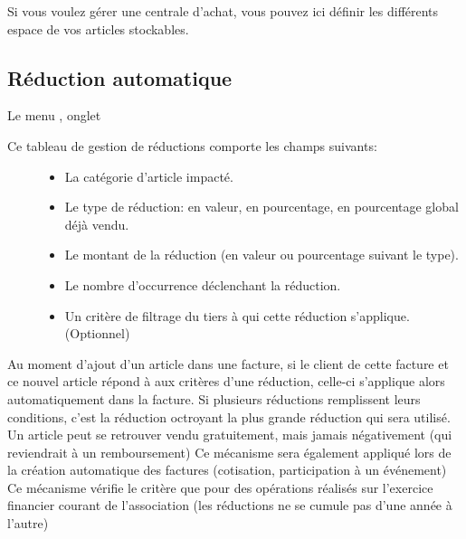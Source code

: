 \documentclass[a4paper,10pt,oneside,french]{sphinxmanual}
\begin{document}
Si vous voulez gérer une centrale d’achat, vous pouvez ici définir les différents espace de vos articles stockables.


\subsection{Réduction automatique}
\label{\detokenize{invoice/configuration:reduction-automatique}}
Le menu , onglet 
\begin{description}
\item[{Ce tableau de gestion de réductions comporte les champs suivants:}] \leavevmode\begin{itemize}
\item {} 
La catégorie d’article impacté.

\item {} 
Le type de réduction: en valeur, en pourcentage, en pourcentage global déjà vendu.

\item {} 
Le montant de la réduction (en valeur ou pourcentage suivant le type).

\item {} 
Le nombre d’occurrence déclenchant la réduction.

\item {} 
Un critère de filtrage du tiers à qui cette réduction s’applique. (Optionnel)

\end{itemize}

\end{description}

Au moment d’ajout d’un article dans une facture, si le client de cette facture et ce nouvel article répond à aux critères d’une réduction,
celle-ci s’applique alors automatiquement dans la facture.
Si plusieurs réductions remplissent leurs conditions, c’est la réduction octroyant la plus grande réduction qui sera utilisé.
Un article peut se retrouver vendu gratuitement, mais jamais négativement (qui reviendrait à un remboursement)
Ce mécanisme sera également appliqué lors de la création automatique des factures (cotisation, participation à un événement)
Ce mécanisme vérifie le critère que pour des opérations réalisés sur l’exercice financier courant de l’association (les réductions ne se cumule pas d’une année à l’autre)
\end{document}
